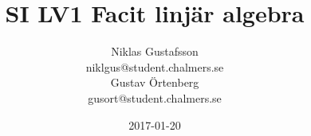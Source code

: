 \documentclass{article}
\title{SI LV1 Facit \small{linjär algebra}}
\author{Niklas Gustafsson \\\small{niklgus@student.chalmers.se} \\
		Gustav Örtenberg \\ \small{gusort@student.chalmers.se}}
\date{2017-01-20}
\begin{document}
\maketitle
\section{}


\section{}


\section{}


\section{}


\section{}


\section{}

\end{document}
